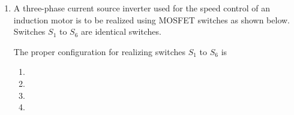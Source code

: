 \documentclass[journal,9pt,onecolumn]{IEEEtran}
\begin{document}
\begin{enumerate}
\item A three-phase current source inverter used for the speed control of an induction motor is to be realized using MOSFET switches as shown below. Switches $S_1$ to $S_6$ are identical switches.
\begin{center}
    
\end{center}
The proper configuration for realizing switches $S_1$ to $S_6$ is
\newpage
\begin{multicols}{2}
    \begin{enumerate}
        \item 
        \item 
        \item 
        \item 
    \end{enumerate}
\end{multicols}

\end{enumerate}
\end{document}
